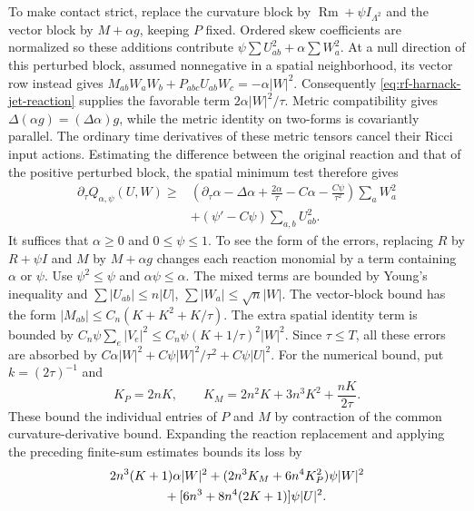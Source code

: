 To make contact strict, replace the curvature block by
$\operatorname{Rm}+\psi I_{\Lambda^2}$ and the vector block by
$M+\alpha g$, keeping $P$ fixed.  Ordered skew coefficients are normalized
so these additions contribute $\psi\sum U_{ab}^2+\alpha\sum W_a^2$.
At a null direction of this perturbed block, assumed nonnegative in a
spatial neighborhood, its vector row instead gives
$M_{ab}W_aW_b+P_{abc}U_{ab}W_c=-\alpha|W|^2$.
Consequently \eqref{eq:rf-harnack-jet-reaction} supplies the favorable
term $2\alpha|W|^2/\tau$.  Metric compatibility gives
$\Delta(\alpha g)=(\Delta\alpha)g$, while the metric identity on
two-forms is covariantly parallel.  The ordinary time derivatives of
these metric tensors cancel their Ricci input actions.  Estimating
the difference between the original reaction and that of the positive
perturbed block, the spatial minimum test therefore gives
\begin{equation}\label{eq:rf-harnack-contact}
\begin{split}
 \partial_\tau Q_{\alpha,\psi}(U,W)\geq{}&
 \left(\partial_\tau\alpha-\Delta\alpha+
 \frac{2\alpha}{\tau}-C\alpha-\frac{C\psi}{\tau^2}\right)\sum_aW_a^2\\
 &+(\psi'-C\psi)\sum_{a,b}U_{ab}^2.
\end{split}
\end{equation}
It suffices that $\alpha\geq0$ and $0\leq\psi\leq1$.
To see the form of the errors, replacing $R$ by $R+\psi I$
and $M$ by $M+\alpha g$ changes each reaction monomial by
a term containing $\alpha$ or $\psi$.  Use $\psi^2\leq\psi$
and $\alpha\psi\leq\alpha$.  The mixed terms are bounded by
Young's inequality and
$\sum|U_{ab}|\leq n|U|$, $\sum|W_a|\leq\sqrt n|W|$.
The vector-block bound has the form
$|M_{ab}|\leq C_n(K+K^2+K/\tau)$.
The extra spatial identity term is bounded by
$C_n\psi\sum_e|V_e|^2
\leq C_n\psi(K+1/\tau)^2|W|^2$.
Since $\tau\leq T$, all these errors are absorbed by
$C\alpha|W|^2+C\psi|W|^2/\tau^2+C\psi|U|^2$.
For the numerical bound, put $k=(2\tau)^{-1}$ and
\[
 K_P=2nK,\qquad
 K_M=2n^2K+3n^3K^2+\frac{nK}{2\tau}.
\]
These bound the individual entries of $P$ and $M$ by contraction
of the common curvature-derivative bound.  Expanding the reaction
replacement and applying the preceding finite-sum estimates bounds
its loss by
\[
\begin{split}
 &2n^3(K+1)\alpha|W|^2
 +(2n^3K_M+6n^4K_P^2)\psi|W|^2\\
 &\hspace{15mm}+[6n^3+8n^4(2K+1)]\psi|U|^2.
\end{split}
\]
